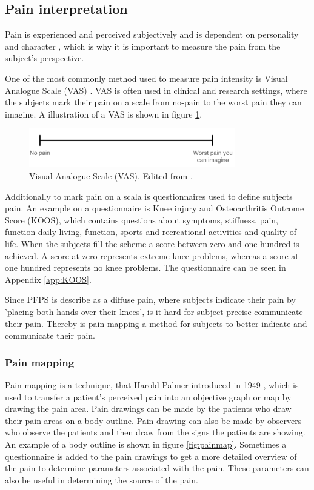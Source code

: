 \subsection{Pain interpretation}
Pain is experienced and perceived subjectively \citep{IASP2012, Younger2009} and is dependent on personality and character \citep{Schmidt2013}, which is why it is important to measure the pain from the subject’s perspective.
 
\noindent
One of the most commonly method used to measure pain intensity is Visual Analogue Scale (VAS) \citep{Valente2011}. VAS is often used in clinical and research settings, where the subjects mark their pain on a scale from no-pain to the worst pain they can imagine.\citep{Haefeli2005} A illustration of a VAS is shown in figure \ref{fig:VAS}.

\begin{figure} [H]
\centering
\includegraphics[width=0.8\textwidth]{figures/VAS}
\caption{Visual Analogue Scale (VAS). Edited from \citep{Haefeli2005}.}
\label{fig:VAS}
\end{figure}

\noindent
Additionally to mark pain on a scala is questionnaires used to define subjects pain. An example on a questionnaire is Knee injury and Osteoarthritis Outcome Score (KOOS), which contains questions about symptoms, stiffness, pain, function daily living, function, sports and recreational activities and quality of life. When the subjects fill the scheme a score between zero and one hundred is achieved. A score at zero represents extreme knee problems, whereas a score at one hundred represents no knee problems.\citep{Roos2003} The questionnaire can be seen in Appendix \ref{app:KOOS}. 

Since PFPS is describe as a diffuse pain, where subjects indicate their pain by 'placing both hands over their knees', is it hard for subject precise communicate their pain. Thereby is pain mapping a method for subjects to better indicate and communicate their pain. 

\subsubsection{Pain mapping}
Pain mapping is a technique, that Harold Palmer introduced in 1949 \citep{Grunnesjo2006}, which is used to transfer a patient’s perceived pain into an objective graph or map by drawing the pain area. Pain drawings can be made by the patients who draw their pain areas on a body outline. Pain drawing can also be made by observers who observe the patients and then draw from the signs the patients are showing. An example of a body outline is shown in figure \ref{fig:painmap}. Sometimes a questionnaire is added to the pain drawings to get a more detailed overview of the pain to determine parameters associated with the pain. These parameters can also be useful in determining the source of the pain.\citep{Schott2010}

